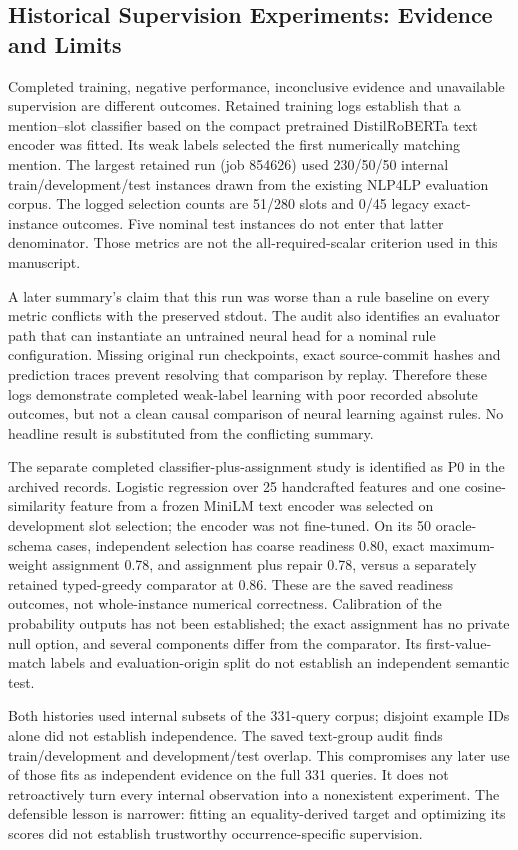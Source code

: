 \subsection{Historical Supervision Experiments: Evidence and Limits}
\label{app:supervision-audit}

Completed training, negative performance, inconclusive evidence and unavailable supervision are different outcomes. Retained training logs establish that a mention--slot classifier based on the compact pretrained DistilRoBERTa text encoder was fitted. Its weak labels selected the first numerically matching mention. The largest retained run (job 854626) used 230/50/50 internal train/development/test instances drawn from the existing NLP4LP evaluation corpus. The logged selection counts are 51/280 slots and 0/45 legacy exact-instance outcomes. Five nominal test instances do not enter that latter denominator. Those metrics are not the all-required-scalar criterion used in this manuscript.

A later summary's claim that this run was worse than a rule baseline on every metric conflicts with the preserved stdout. The audit also identifies an evaluator path that can instantiate an untrained neural head for a nominal rule configuration. Missing original run checkpoints, exact source-commit hashes and prediction traces prevent resolving that comparison by replay. Therefore these logs demonstrate completed weak-label learning with poor recorded absolute outcomes, but not a clean causal comparison of neural learning against rules. No headline result is substituted from the conflicting summary.

The separate completed classifier-plus-assignment study is identified as P0 in the archived records. Logistic regression over 25 handcrafted features and one cosine-similarity feature from a frozen MiniLM text encoder was selected on development slot selection; the encoder was not fine-tuned. On its 50 oracle-schema cases, independent selection has coarse readiness 0.80, exact maximum-weight assignment 0.78, and assignment plus repair 0.78, versus a separately retained typed-greedy comparator at 0.86. These are the saved readiness outcomes, not whole-instance numerical correctness. Calibration of the probability outputs has not been established; the exact assignment has no private null option, and several components differ from the comparator. Its first-value-match labels and evaluation-origin split do not establish an independent semantic test.

Both histories used internal subsets of the 331-query corpus; disjoint example IDs alone did not establish independence. The saved text-group audit finds train/development and development/test overlap. This compromises any later use of those fits as independent evidence on the full 331 queries. It does not retroactively turn every internal observation into a nonexistent experiment. The defensible lesson is narrower: fitting an equality-derived target and optimizing its scores did not establish trustworthy occurrence-specific supervision.

